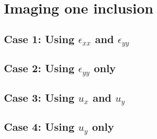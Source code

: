 \documentclass[12pt]{article}
\begin{document}
\section{Imaging one inclusion}
\subsection{Case 1: Using $\epsilon_{xx}$ and $\epsilon_{yy}$}
\subsection{Case 2: Using $\epsilon_{yy}$ only}
\subsection{Case 3: Using $u_x$ and $u_y$}
\subsection{Case 4: Using $u_y$ only}
\end{document}

